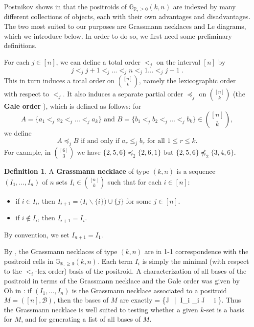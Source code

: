 \documentclass[11pt]{article}
\newcommand{\R}{\mathbb{R}}
\newcommand{\Gr}{\mathbb{G}_{\R, \geq 0}}
\def\ba #1\ea{\begin{align} #1 \end{align}}
\newcommand{\cB}{\mathcal{B}}
\newcommand{\gale}[1]{\preccurlyeq_{#1}}
\theoremstyle{remark}
\theoremstyle{definition}
\newtheorem{dfn}[thm]{Definition}
\begin{document}
Postnikov shows in \cite{Postnikov} that the positroids of $\Gr(k,n)$ are indexed by many different collections of objects, each with their own advantages and disadvantages. The two most suited to our purposes are Grassmann necklaces and Le diagrams, which we introduce below. In order to do so, we first need some preliminary definitions.

For each $j \in [n]$, we can define a total order $<_j$ on the interval $[n]$ by
\[ j <_j j+1 <_j \dots <_j n <_j 1 \dots <_j j-1\;.\]
This in turn induces a total order on $\binom{[n]}{k}$, namely the lexicographic order with respect to $<_j$.  It also induces a separate partial order $\gale{j}$ on $\binom{[n]}{k}$ (the {\bf Gale order} \cite{Gale}), which is defined as follows: for 
\[A = \{a_1 <_j a_2 <_j \dots <_j a_k\} \text{ and } B = \{b_1 <_j b_2 <_j \dots <_j b_k\} \in \binom{[n]}{k},\] we define
\[A \gale{j} B \text{ if and only if } a_r \leq_j b_r \text{ for all }1 \leq r \leq k.\]
For example, in $\binom{[6]}{3}$ we have $\{2,5,6\}\gale{2} \{2,6,1\}$ but $\{2,5,6\}\not\gale{2}\{3,4,6\}$.


\begin{dfn}\label{def:grassmann necklace}
A {\bf Grassmann necklace} of type $(k,n)$ is a sequence $(I_1, \dots, I_n)$ of $n$ sets $I_i \in \binom{[n]}{k}$ such that for each $i \in [n]$:
\begin{itemize}
\item if $i \in I_i$, then $I_{i+1} = \big(I_i \backslash \{i\}\big) \cup \{j\}$ for some $j \in[n]$.
\item if $i \not\in I_i$, then $I_{i+1} = I_i$.
\end{itemize}
By convention, we set $I_{n+1} = I_1$.
\end{dfn}

By \cite[Theorem 17.1]{Postnikov}, the Grassmann necklaces of type $(k,n)$ are in 1-1 correspondence with the positroid cells in $\Gr(k,n)$. Each term $I_i$ is simply the minimal (with respect to the $<_i$-lex order) basis of the positroid. A characterization of all bases of the positroid in terms of the Grassmann necklace and the Gale order was given by Oh in \cite[Theorem 8]{Oh}: if $(I_1, \dots, I_n)$ is the Grassmann necklace associated to a positroid $M = ([n],\cB)$, then the bases of $M$ are exactly
\ba \cB = \left\{J \in {}\ \Big|\ I_i \gale{i} J \ \ \forall i \in [n]\right\}. \label{basesofmatroids}\ea
Thus the Grassmann necklace is well suited to testing whether a given $k$-set is a basis for $M$, and for generating a list of all bases of $M$.
\end{document}
